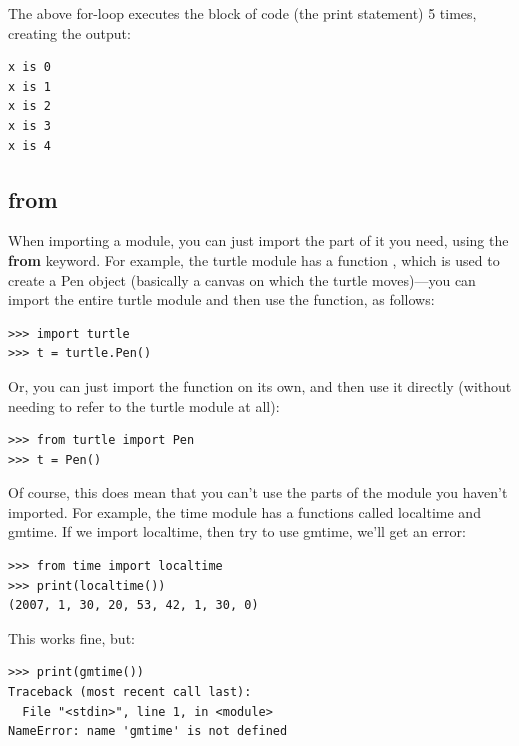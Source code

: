\noindent
The above for-loop executes the block of code (the print statement) 5 times, creating the output:

\begin{listing}
\begin{verbatim}
x is 0
x is 1
x is 2
x is 3
x is 4
\end{verbatim}
\end{listing}

\subsection*{from}

When importing a module, you can just import the part of it you need, using the \textbf{from} keyword. For example, the turtle module has a function , which is used to create a Pen object (basically a canvas on which the turtle moves)---you can import the entire turtle module and then use the  function, as follows:

\begin{listingignore}
\begin{verbatim}
>>> import turtle
>>> t = turtle.Pen()
\end{verbatim}
\end{listingignore}

Or, you can just import the  function on its own, and then use it directly (without needing to refer to the turtle module at all):

\begin{listingignore}
\begin{verbatim}
>>> from turtle import Pen
>>> t = Pen()
\end{verbatim}
\end{listingignore}

Of course, this does mean that you can't use the parts of the module you haven't imported.  For example, the time module has a functions called localtime and gmtime.  If we import localtime, then try to use gmtime, we'll get an error:

\begin{listingignore}
\begin{verbatim}
>>> from time import localtime
>>> print(localtime())
(2007, 1, 30, 20, 53, 42, 1, 30, 0)
\end{verbatim}
\end{listingignore}

\noindent
This works fine, but:

\begin{listing}
\begin{verbatim}
>>> print(gmtime())
Traceback (most recent call last):
  File "<stdin>", line 1, in <module>
NameError: name 'gmtime' is not defined
\end{verbatim}
\end{listing}

